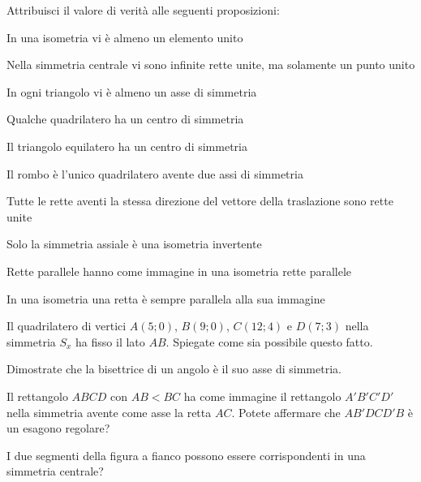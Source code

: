 \begin{esercizio}
\label{ese:8.90} %
Attribuisci il valore di verità alle seguenti proposizioni:
\begin{enumeratea}
\item In una isometria vi è almeno un elemento unito\hfill\boxV\quad\boxF
\item Nella simmetria centrale vi sono infinite rette unite, ma solamente un punto unito\tab\tab\hfill\boxV\quad\boxF
\item In ogni triangolo vi è almeno un asse di simmetria\hfill\boxV\quad\boxF
\item Qualche quadrilatero ha un centro di simmetria\hfill\boxV\quad\boxF
\item Il triangolo equilatero ha un centro di simmetria\hfill\boxV\quad\boxF
\item Il rombo è l'unico quadrilatero avente due assi di simmetria\hfill\boxV\quad\boxF
\item Tutte le rette aventi la stessa direzione del vettore della traslazione sono rette unite\tab\tab\hfill\boxV\quad\boxF
\item Solo la simmetria assiale è una isometria invertente\hfill\boxV\quad\boxF
\item Rette parallele hanno come immagine in una isometria rette parallele\hfill\boxV\quad\boxF
\item In una isometria una retta è sempre parallela alla sua immagine\hfill\boxV\quad\boxF
\end{enumeratea}
\end{esercizio}

\begin{esercizio}
\label{ese:8.91} %
Il quadrilatero di vertici $A(5;0)$, $B(9;0)$, $C(12;4)$ e $D(7;3)$ nella simmetria $S_x$ ha fisso il lato $AB$. Spiegate come sia possibile questo fatto.
\end{esercizio}

\begin{esercizio}
\label{ese:8.92} %
Dimostrate che la bisettrice di un angolo è il suo asse di simmetria.
\end{esercizio}

\begin{esercizio}
\label{ese:8.93} %
Il rettangolo $ABCD$ con $AB<BC$ ha come immagine il rettangolo $A'B'C'D'$ nella simmetria avente come asse la retta $AC$. Potete affermare che $AB'DCD'B$ è un esagono regolare?
\end{esercizio}

\noindent\begin{minipage}{0.75\textwidth}\parindent15pt
\begin{esercizio}
\label{ese:8.94} %
I due segmenti della figura a fianco possono essere corrispondenti in una simmetria centrale? 
\end{esercizio}
\end{minipage}\hfil
\begin{minipage}{0.25\textwidth}
	\centering~~
\end{minipage}\vspace{8pt}

